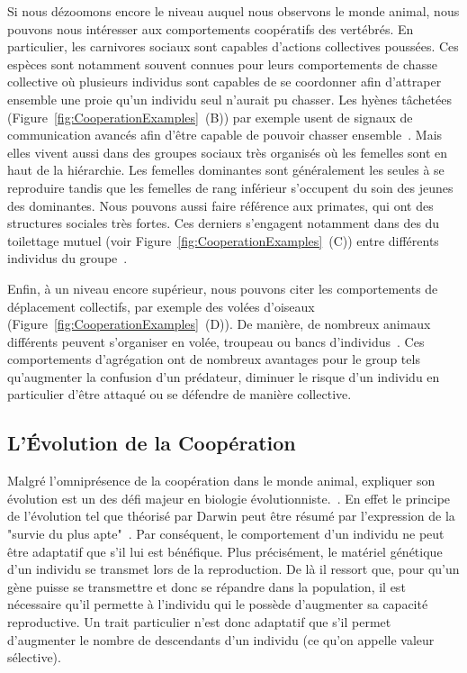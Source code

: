 		Si nous dézoomons encore le niveau auquel nous observons le monde animal, nous pouvons nous intéresser aux comportements coopératifs des vertébrés. En particulier, les carnivores sociaux sont capables d'actions collectives poussées. Ces espèces sont notamment souvent connues pour leurs comportements de chasse collective où plusieurs individus sont capables de se coordonner afin d'attraper ensemble une proie qu'un individu seul n'aurait pu chasser. Les hyènes tâchetées (Figure~\ref{fig:CooperationExamples}~(B)) par exemple usent de signaux de communication avancés afin d'être capable de pouvoir chasser ensemble~\parencite{Drea2009a, Smith2010, Smith2012a}. Mais elles vivent aussi dans des groupes sociaux très organisés où les femelles sont en haut de la hiérarchie. Les femelles dominantes sont généralement les seules à se reproduire tandis que les femelles de rang inférieur s'occupent du soin des jeunes des dominantes. Nous pouvons aussi faire référence aux primates, qui ont des structures sociales très fortes. Ces derniers s'engagent notamment dans des du toilettage mutuel (voir Figure~\ref{fig:CooperationExamples}~(C)) entre différents individus du groupe~\parencite{Spruijt1992}.

		Enfin, à un niveau encore supérieur, nous pouvons citer les comportements de déplacement collectifs, par exemple des volées d'oiseaux (Figure~\ref{fig:CooperationExamples}~(D)). De manière, de nombreux animaux différents peuvent s'organiser en volée, troupeau ou bancs d'individus~\parencite{Couzin2002, Couzin2003}. Ces comportements d'agrégation ont de nombreux avantages pour le group tels qu'augmenter la confusion d'un prédateur, diminuer le risque d'un individu en particulier d'être attaqué ou se défendre de manière collective.


	\subsection{L'Évolution de la Coopération}

		Malgré l'omniprésence de la coopération dans le monde animal, expliquer son évolution est un des défi majeur en biologie évolutionniste.~\parencite{Hamilton1964, Dugatkin2002, West2011a}. En effet le principe de l'évolution tel que théorisé par Darwin peut être résumé par l'expression de la "survie du plus apte"~\parencite{Darwin1859}. Par conséquent, le comportement d'un individu ne peut être adaptatif que s'il lui est bénéfique. Plus précisément, le matériel génétique d'un individu se transmet lors de la reproduction. De là il ressort que, pour qu'un gène puisse se transmettre et donc se répandre dans la population, il est nécessaire qu'il permette à l'individu qui le possède d'augmenter sa capacité reproductive. Un trait particulier n'est donc adaptatif que s'il permet d'augmenter le nombre de descendants d'un individu (ce qu'on appelle valeur sélective).

